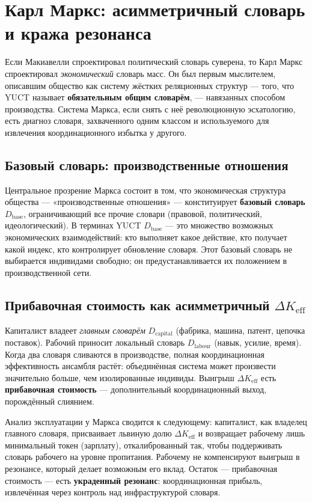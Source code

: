 \documentclass[12pt,a4paper]{article}
\begin{document}
	\section{Карл Маркс: асимметричный словарь и кража резонанса}
	\label{sec:marx}
	
	Если Макиавелли спроектировал политический словарь суверена, то Карл Маркс спроектировал \emph{экономический} словарь масс. Он был первым мыслителем, описавшим общество как систему жёстких реляционных структур — того, что YUCT называет \textbf{обязательным общим словарём}, — навязанных способом производства. Система Маркса, если снять с неё революционную эсхатологию, есть диагноз словаря, захваченного одним классом и используемого для извлечения координационного избытка у другого.
	
	\subsection{Базовый словарь: производственные отношения}
	
	Центральное прозрение Маркса состоит в том, что экономическая структура общества — «производственные отношения» — конституирует \textbf{базовый словарь} \(D_{\text{base}}\), ограничивающий все прочие словари (правовой, политический, идеологический). В терминах YUCT \(D_{\text{base}}\) — это множество возможных экономических взаимодействий: кто выполняет какое действие, кто получает какой индекс, кто контролирует обновление словаря. Этот базовый словарь не выбирается индивидами свободно; он предустанавливается их положением в производственной сети.
	
	\subsection{Прибавочная стоимость как асимметричный \(\Delta K_{\mathrm{eff}}\)}
	
	Капиталист владеет \emph{главным словарём} \(D_{\text{capital}}\) (фабрика, машина, патент, цепочка поставок). Рабочий приносит локальный словарь \(D_{\text{labour}}\) (навык, усилие, время). Когда два словаря сливаются в производстве, полная координационная эффективность ансамбля растёт: объединённая система может произвести значительно больше, чем изолированные индивиды. Выигрыш \(\Delta K_{\mathrm{eff}}\) есть \textbf{прибавочная стоимость} — дополнительный координационный выход, порождённый слиянием.
	
	Анализ эксплуатации у Маркса сводится к следующему: капиталист, как владелец главного словаря, присваивает львиную долю \(\Delta K_{\mathrm{eff}}\) и возвращает рабочему лишь минимальный токен (зарплату), откалиброванный так, чтобы поддерживать словарь рабочего на уровне пропитания. Рабочему не компенсируют выигрыш в резонансе, который делает возможным его вклад. Остаток — прибавочная стоимость — есть \textbf{украденный резонанс}: координационная прибыль, извлечённая через контроль над инфраструктурой словаря.
	
\end{document}
